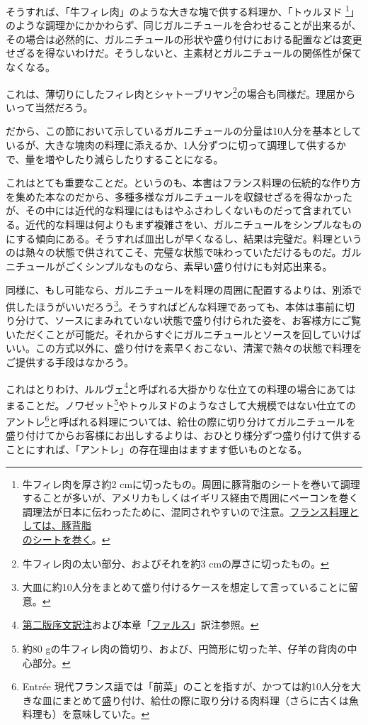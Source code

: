 そうすれば、「牛フィレ肉」のような大きな塊で供する料理か、「トゥルヌド
\footnote{牛フィレ肉を厚さ約2
  cmに切ったもの。周囲に豚背脂のシートを巻いて調理することが多いが、アメリカもしくはイギリス経由で周囲にベーコンを巻く調理法が日本に伝わったために、混同されやすいので注意。\ul{フランス料理としては、豚背脂\\のシートを巻く}。}」のような調理かにかかわらず、同じガルニチュールを合わせることが出来るが、その場合は必然的に、ガルニチュールの形状や盛り付けにおける配置などは変更せざるを得ないわけだ。そうしないと、主素材とガルニチュールの関係性が保てなくなる。

これは、薄切りにしたフィレ肉とシャトーブリヤン\footnote{牛フィレ肉の太い部分、およびそれを約3
  cmの厚さに切ったもの。}の場合も同様だ。理屈からいって当然だろう。

だから、この節において示しているガルニチュールの分量は10人分を基本としているが、大きな塊肉の料理に添えるか、1人分ずつに切って調理して供するかで、量を増やしたり減らしたりすることになる。

これはとても重要なことだ。というのも、本書はフランス料理の伝統的な作り方を集めた本なのだから、多種多様なガルニチュールを収録せざるを得なかったが、その中には近代的な料理にはもはやふさわしくないものだって含まれている。近代的な料理は何よりもまず複雑さをい、ガルニチュールをシンプルなものにする傾向にある。そうすれば皿出しが早くなるし、結果は完璧だ。料理というのは熱々の状態で供されてこそ、完璧な状態で味わっていただけるものだ。ガルニチュールがごくシンプルなものなら、素早い盛り付けにも対応出来る。

同様に、もし可能なら、ガルニチュールを料理の周囲に配置するよりは、別添で供したほうがいいだろう\footnote{大皿に約10人分をまとめて盛り付けるケースを想定して言っていることに留意。}。そうすればどんな料理であっても、本体は事前に切り分けて、ソースにまみれていない状態で盛り付けられた姿を、お客様方にご覧いただくことが可能だ。それからすぐにガルニチュールとソースを回していけばいい。この方式以外に、盛り付けを素早くおこない、清潔で熱々の状態で料理をご提供する手段はなかろう。

これはとりわけ、ルルヴェ\footnote{\protect\hyperlink{releve}{第二版序文訳注}および本章「\protect\hyperlink{farces}{ファルス}」訳注参照。}と呼ばれる大掛かりな仕立ての料理の場合にあてはまることだ。ノワゼット\footnote{約80
  gの牛フィレ肉の筒切り、および、円筒形に切った羊、仔羊の背肉の中心部分。}やトゥルヌドのようなさして大規模ではない仕立てのアントレ\footnote{Entrée
  現代フランス語では「前菜」のことを指すが、かつては約10人分を大きな皿にまとめて盛り付け、給仕の際に取り分ける肉料理（さらに古くは魚料理も）を意味していた。}と呼ばれる料理については、給仕の際に切り分けてガルニチュールを盛り付けてからお客様にお出しするよりは、おひとり様分ずつ盛り付けて供することにすれば、「アントレ」の存在理由はますます低いものとなる。

